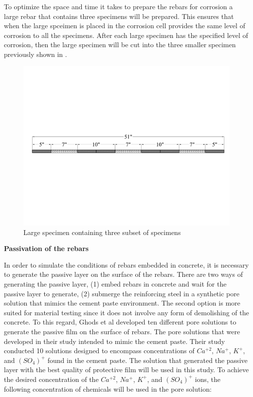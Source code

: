 To optimize the space and time it takes to prepare the rebars for corrosion a large rebar that contains three specimens will be prepared. This ensures that when the large spceimen is placed in the corrosion cell provides the same level of corrosion to all the specimens. After each large specimen has the specified level of corrosion, then the large specimen will be cut into the three smaller specimen previously shown in .

\begin{figure}[htbp]
	\centering
	\includegraphics[width=1.0\textwidth]{Chapter-3/figs/LargeSpecimen}
	\caption{Large specimen containing three subset of specimens}
	\label{fig:LargeSpecimen}
\end{figure}

\newpage

\textbf{Passivation of the rebars}

In order to simulate the conditions of rebars embedded in concrete, it is necessary to generate the passive layer on the surface of the rebars. There are two ways of generating the passive layer, (1) embed rebars in concrete and wait for the passive layer to generate, (2) submerge the reinforcing steel in a synthetic pore solution that mimics the cement paste environment. The second option is more suited for material testing since it does not involve any form of demolishing of the concrete. To this regard, Ghods et al \cite{Ghods2010} developed ten different pore solutions to generate the passive film on the surface of rebars. The pore solutions that were developed in their study intended to mimic the cement paste. Their study conducted 10 solutions designed to encompass concentrations of $Ca^{+2}$, $Na^{+}$, $K^{+}$, and $(SO_{4})^{+}$ found in the cement paste. The solution that generated the passive layer with the best quality of protective film will be used in this study. To achieve the desired concentration of the $Ca^{+2}$, $Na^{+}$, $K^{+}$, and $(SO_{4})^{+}$ ions, the following concentration of chemicals will be used in the pore solution:

